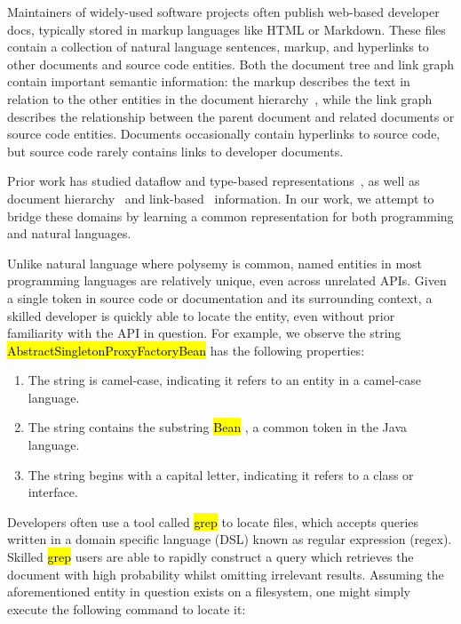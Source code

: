 \documentclass{article}
\newcommand{\tinline}[1]{%
    \begingroup%
    \sethlcolor{slightgray}%
    \hl{\ttfamily\footnotesize #1}%
    \endgroup
}
\begin{document}
Maintainers of widely-used software projects often publish web-based developer docs, typically stored in markup languages like HTML or Markdown. These files contain a collection of natural language sentences, markup, and hyperlinks to other documents and source code entities. Both the document tree and link graph contain important semantic information: the markup describes the text in relation to the other entities in the document hierarchy~\citep{yang2016hierarchical}, while the link graph describes the relationship between the parent document and related documents or source code entities. Documents occasionally contain hyperlinks to source code, but source code rarely contains links to developer documents.

Prior work has studied dataflow and type-based representations~\citep{si2018learning, gu2018deep, liu2019neural}, as well as document hierarchy~\citep{yang2016hierarchical} and link-based~\citep{zhang2018link} information. In our work, we attempt to bridge these domains by learning a common representation for both programming and natural languages.

Unlike natural language where polysemy is common, named entities in most programming languages are relatively unique, even across unrelated APIs. Given a single token in source code or documentation and its surrounding context, a skilled developer is quickly able to locate the entity, even without prior familiarity with the API in question. For example, we observe the string \tinline{AbstractSingletonProxyFactoryBean} has the following properties:

\begin{enumerate}
    \item The string is camel-case, indicating it refers to an entity in a camel-case language.
    \item The string contains the substring \tinline{Bean}, a common token in the Java language.
    \item The string begins with a capital letter, indicating it refers to a class or interface.
\end{enumerate}

Developers often use a tool called \tinline{grep} to locate files, which accepts queries written in a domain specific language (DSL) known as regular expression (regex). Skilled \tinline{grep} users are able to rapidly construct a query which retrieves the document with high probability whilst omitting irrelevant results. Assuming the aforementioned entity in question exists on a filesystem, one might simply execute the following command to locate it:
\end{document}
